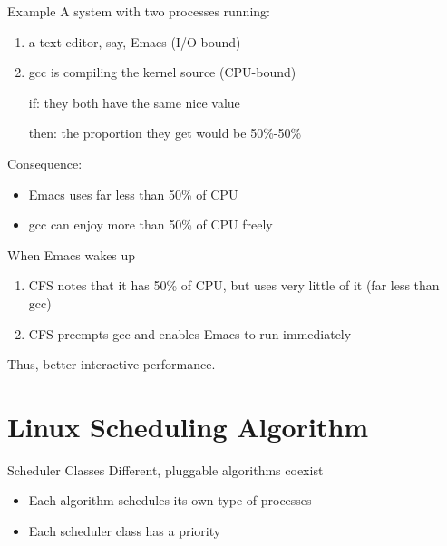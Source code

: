\begin{frame}{Example}
  A system with two processes running:
  \begin{enumerate}
  \item a text editor, say, Emacs (I/O-bound)
  \item gcc is compiling the kernel source (CPU-bound)
  \end{enumerate}
  \begin{itemize}
  \item[if:] they both have the same nice value
  \item[then:] the proportion they get would be 50\%-50\%
  \end{itemize}
  Consequence:
  \begin{itemize}
  \item Emacs uses far less than 50\% of CPU
  \item gcc can enjoy more than 50\% of CPU freely
  \end{itemize}
  When Emacs wakes up
  \begin{enumerate}
  \item CFS notes that it has 50\% of CPU, but uses very little of it (far less than gcc)
  \item CFS preempts gcc and enables Emacs to run immediately
  \end{enumerate}
  Thus, better interactive performance.
\end{frame}

\section{Linux Scheduling Algorithm}
\label{sec:linux-sched-algor}

\begin{frame}{Scheduler Classes}
  Different, pluggable algorithms coexist 
  \begin{itemize}
  \item Each algorithm schedules its own type of processes
  \item Each scheduler class has a priority
  \end{itemize}
  \begin{description}
  \item[]
  \item[]
  \item[] 
  \end{description}
\end{frame}

